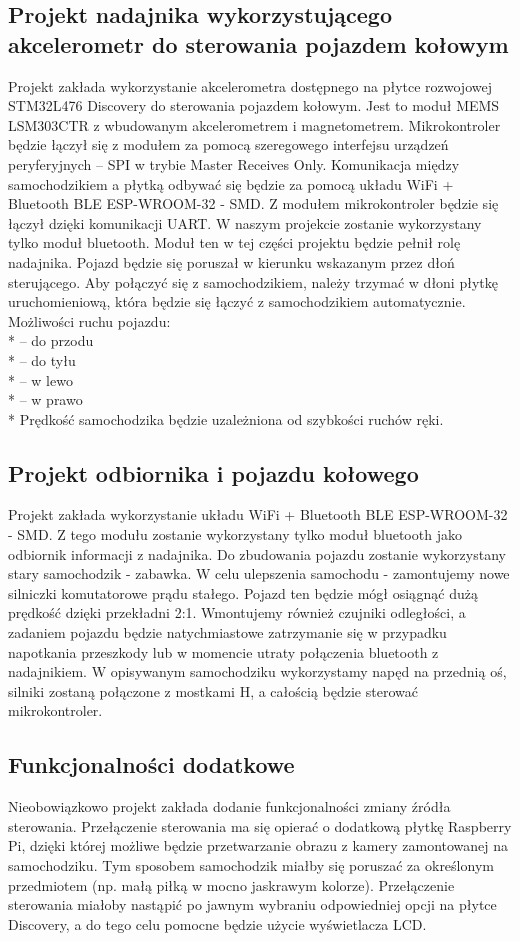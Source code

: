 \documentclass[10pt, a4paper]{article}
\begin{document}
\subsection{Projekt nadajnika wykorzystującego akcelerometr do sterowania pojazdem kołowym}
Projekt zakłada wykorzystanie akcelerometra dostępnego na płytce rozwojowej STM32L476 Discovery do sterowania pojazdem kołowym. Jest to moduł MEMS LSM303CTR z wbudowanym akcelerometrem i magnetometrem. Mikrokontroler będzie łączył się z modułem za pomocą szeregowego  interfejsu urządzeń peryferyjnych -- SPI w trybie Master Receives Only. Komunikacja między samochodzikiem a płytką odbywać się będzie za pomocą układu WiFi + Bluetooth BLE ESP-WROOM-32 - SMD. Z modułem mikrokontroler będzie się łączył dzięki komunikacji UART. W naszym projekcie zostanie wykorzystany tylko moduł bluetooth. Moduł ten w tej części projektu będzie pełnił rolę nadajnika. Pojazd będzie się poruszał w kierunku wskazanym przez dłoń sterującego. Aby połączyć się z samochodzikiem, należy trzymać w dłoni płytkę uruchomieniową, która będzie się łączyć z samochodzikiem automatycznie. 
Możliwości ruchu pojazdu:
\\* -- do przodu
\\* -- do tyłu
\\* -- w lewo
\\* -- w prawo
\\* Prędkość samochodzika będzie uzależniona od szybkości ruchów ręki.


\subsection{Projekt odbiornika i pojazdu kołowego}
Projekt zakłada wykorzystanie układu WiFi + Bluetooth BLE ESP-WROOM-32 - SMD. Z tego modułu zostanie wykorzystany tylko moduł bluetooth jako odbiornik informacji z nadajnika. Do zbudowania pojazdu zostanie wykorzystany stary samochodzik - zabawka. W celu ulepszenia samochodu - zamontujemy nowe silniczki komutatorowe prądu stałego. Pojazd ten będzie mógł osiągnąć dużą prędkość dzięki przekładni 2:1. Wmontujemy również czujniki odległości, a zadaniem pojazdu będzie natychmiastowe zatrzymanie się w przypadku napotkania przeszkody lub w momencie utraty połączenia bluetooth z nadajnikiem.
W opisywanym samochodziku wykorzystamy napęd na przednią oś, silniki zostaną połączone z mostkami H, a całością będzie sterować mikrokontroler.

\subsection{Funkcjonalności dodatkowe}
Nieobowiązkowo projekt zakłada dodanie funkcjonalności zmiany źródła sterowania. Przełączenie sterowania ma się opierać o dodatkową płytkę Raspberry Pi, dzięki której możliwe będzie przetwarzanie obrazu z kamery zamontowanej na samochodziku. Tym sposobem samochodzik miałby się poruszać za określonym przedmiotem (np. małą piłką w mocno jaskrawym kolorze). Przełączenie sterowania miałoby nastąpić po jawnym wybraniu odpowiedniej opcji na płytce Discovery, a do tego celu pomocne będzie użycie wyświetlacza LCD. 
\end{document}
